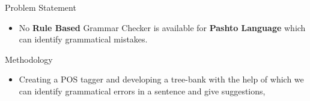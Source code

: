 \documentclass{beamer}
\begin{document}





\begin{frame}{Problem Statement}
\begin{itemize}
\item  No \textbf{Rule Based} Grammar Checker is available for \textbf{Pashto Language} which can identify grammatical mistakes.
\end{itemize}
\end{frame}


\begin{frame}{Methodology}
\begin{itemize}
	\item Creating a POS tagger and developing a tree-bank with the help of which we can identify grammatical errors in a sentence and give suggestions,
\end{itemize}
\end{frame}
\end{document}
